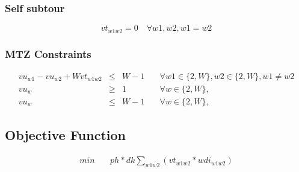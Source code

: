 \documentclass[11pt, oneside]{article}   	%
\begin{document}
\subsubsection*{Self subtour}
\begin{equation}
	vt_{w1w2} = 0 \quad \forall w1, w2, w1=w2
\end{equation}

\subsubsection*{MTZ Constraints}
\begin{equation}
\begin{aligned}
	vu_{w1} - vu_{w2} + W vt_{w1w2} & \le &  W-1 & \quad \forall w1 \in \{2,W\}, w2 \in \{2,W\}, w1 \ne w2 \\ 
	vu_{w} & \ge & 1 & \quad \forall w \in \{2,W\},  \\
	vu_{w} & \le & W-1 & \quad \forall w \in \{2,W\},  
\end{aligned}
\end{equation}

\subsection*{Objective Function}
\begin{equation}
\begin{aligned}
	min 	\quad &	ph * dk \sum_{w1w2}  (vt_{w1w2} * wdi_{w1w2} )
\end{aligned}
\end{equation}
\end{document}
